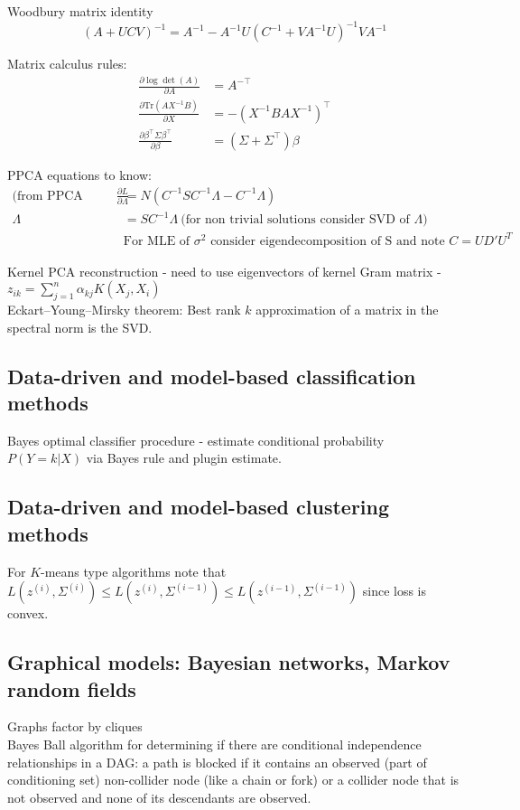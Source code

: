 \documentclass{article}
\begin{document}
Woodbury matrix identity
\[ (A + UCV)^{-1} = A^{-1} - A^{-1}U(C^{-1} + VA^{-1}U)^{-1}VA^{-1} \]

Matrix calculus rules:
\begin{align*}
  \frac{\partial \log \det (A)}{\partial A} &= A^{-\top} \\
  \frac{\partial \text{Tr}(AX^{-1}B) }{\partial X} &= -(X^{-1}BAX^{-1})^\top \\
  \frac{\partial \beta^{\top} \Sigma \beta^{\top}}{\partial \beta} &= (\Sigma + \Sigma^\top)\beta
\end{align*}

PPCA equations to know:
\begin{align*}
  \text{(from PPCA paper)} \  \frac{\partial L}{\partial \Lambda} &= N (C^{-1}S C^{-1}\Lambda - C^{-1}\Lambda)\\
  \Lambda &= SC^{-1} \Lambda \ \text{(for non trivial solutions consider SVD of $\Lambda$)} \\
  &\text{For MLE of $\sigma^2$ consider eigendecomposition of S and note } C = UD'U^T
\end{align*}

Kernel PCA reconstruction - need to use eigenvectors of kernel Gram matrix - $z_{ik} = \sum_{j=1}^n \alpha_{kj} K(X_j, X_i)$ \\

Eckart–Young–Mirsky theorem: Best rank $k$ approximation of a matrix in the spectral norm is the SVD.
\subsection{Data-driven and model-based classification methods}
Bayes optimal classifier procedure - estimate conditional probability $P(Y=k|X)$ via Bayes rule and plugin estimate.

\subsection{Data-driven and model-based clustering methods}
For $K$-means type algorithms note that $L(z^{(i)}, \Sigma^{(i)}) \leq L(z^{(i)}, \Sigma^{(i-1)}) \leq L(z^{(i-1)}, \Sigma^{(i-1)})$ since loss is convex.
\subsection{Graphical models: Bayesian networks, Markov random fields}
Graphs factor by cliques \\
Bayes Ball algorithm for determining if there are conditional independence relationships in a DAG: a path is blocked if it
contains an observed (part of conditioning set) non-collider node (like a chain or fork) or a collider node that is not observed and none of its descendants are observed.
\end{document}
